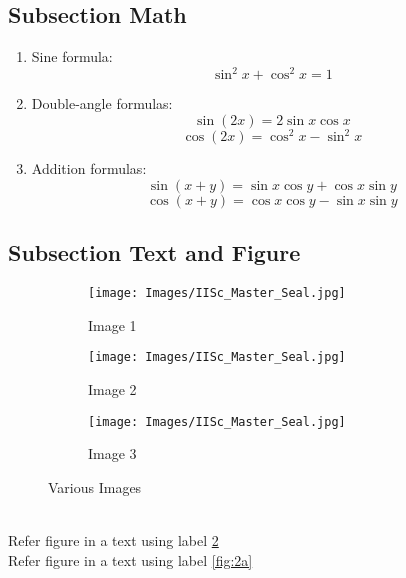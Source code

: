 \documentclass[12pt,twoside,a4paper]{report}
\begin{document}
\subsection{Subsection Math}
\begin{enumerate}
    \item Sine formula:
    \[
        \sin^2 x + \cos^2 x = 1
    \]

    \item Double-angle formulas:
    \[
        \sin(2x) = 2 \sin x \cos x
    \]
    \[
        \cos(2x) = \cos^2 x - \sin^2 x
    \]
    
    \item Addition formulas:
    \[
        \sin(x + y) = \sin x \cos y + \cos x \sin y
    \]
    \[
        \cos(x + y) = \cos x \cos y - \sin x \sin y
    \]
\end{enumerate}

\subsection{Subsection Text and Figure}
\lipsum[1-3]
 \begin{figure}[htbp]
        \centering
        \begin{subfigure}[b]{0.3\textwidth}
            \centering
            \texttt{[image: Images/IISc\_Master\_Seal.jpg]}
            \caption{Image 1}
            \label{fig:1a}
        \end{subfigure}
        \begin{subfigure}[b]{0.3\textwidth}
            \centering
            \texttt{[image: Images/IISc\_Master\_Seal.jpg]}
            \caption{Image 2}
             \label{fig:1b}
        \end{subfigure}
        \begin{subfigure}[b]{0.3\textwidth}
            \centering
            \texttt{[image: Images/IISc\_Master\_Seal.jpg]}
            \caption{Image 3}
             \label{fig:1c}
        \end{subfigure}
        \caption{Various Images}
    \end{figure}

\lipsum[1-3]\\[2cm]
{\LARGE {Refer figure in a text using label \ref{fig:1b}}}\\ [2cm]
{\LARGE {Refer figure in a text using label \ref{fig:2a}}}\\[2cm]
\lipsum[1-3]
\end{document}
